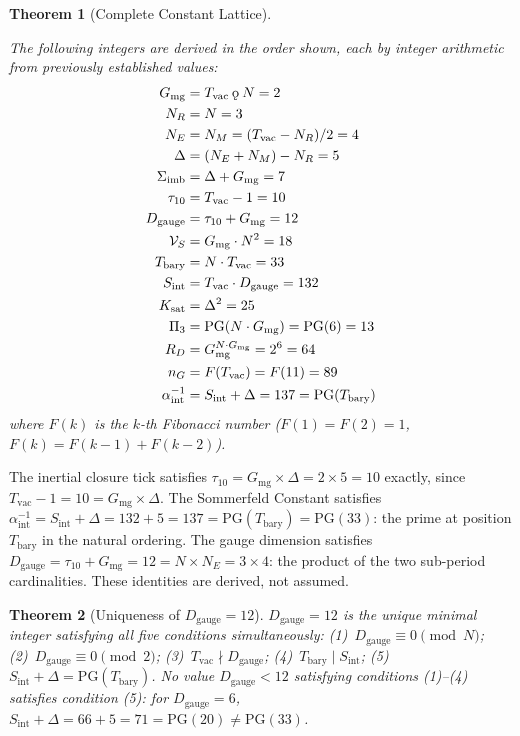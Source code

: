 \documentclass[11pt,letterpaper]{article}
\theoremstyle{plain}
\newtheorem{theorem}{Theorem}[section]
\theoremstyle{definition}
\theoremstyle{remark}
\newcommand{\koppa}{\mathbin{\text{\rm\k{o}}}}
\newcommand{\Tbary}{T_{\mathrm{bary}}}
\newcommand{\Dg}{D_{\mathrm{gauge}}}
\newcommand{\Sint}{S_{\mathrm{int}}}
\newcommand{\Sigimb}{\Sigma_{\mathrm{imb}}}
\newcommand{\VS}{\mathcal{V}_S}
\newcommand{\PG}{\mathrm{PG}}
\newcommand{\Gmg}{G_{\mathrm{mg}}}
\newcommand{\Ksat}{K_{\mathrm{sat}}}
\newcommand{\Tvac}{T_{\mathrm{vac}}}
\newcommand{\tauX}{\tau_{10}}
\newcommand{\Pithree}{\Pi_3}
\newcommand{\nG}{n_G}
\newcommand{\aSC}{\alpha^{-1}_{\mathrm{int}}}
\newcommand{\RD}{R_D}
\newcommand{\FibN}[1]{F(#1)}
\begin{document}
\begin{theorem}[Complete Constant Lattice]\label{thm:lattice}
\begin{rsbox}
The following integers are derived in the order shown, each by
integer arithmetic from previously established values:
\begin{align}
\Gmg &= \Tvac\koppa N = 2 \label{eq:gmg}\\
N_R &= N = 3 \label{eq:nr}\\
N_E &= N_M = (\Tvac-N_R)/2 = 4 \label{eq:ne}\\
\Delta &= (N_E+N_M)-N_R = 5 \label{eq:delta}\\
\Sigimb &= \Delta+\Gmg = 7 \label{eq:sigma}\\
\tauX &= \Tvac-1 = 10 \label{eq:tau10}\\
\Dg &= \tauX+\Gmg = 12 \label{eq:dg}\\
\VS &= \Gmg\cdot N^2 = 18 \label{eq:vs}\\
\Tbary &= N\cdot\Tvac = 33 \label{eq:tbary}\\
\Sint &= \Tvac\cdot\Dg = 132 \label{eq:sint}\\
\Ksat &= \Delta^2 = 25 \label{eq:ksat}\\
\Pithree &= \PG(N\cdot\Gmg) = \PG(6) = 13 \label{eq:pi3}\\
\RD &= \Gmg^{N\cdot\Gmg} = 2^6 = 64 \label{eq:rd}\\
\nG &= \FibN{\Tvac} = \FibN{11} = 89 \label{eq:ng}\\
\aSC &= \Sint+\Delta = 137 = \PG(\Tbary) \label{eq:alpha}
\end{align}
where $\FibN{k}$ is the $k$-th Fibonacci number
($\FibN{1}=\FibN{2}=1$, $\FibN{k}=\FibN{k-1}+\FibN{k-2}$).
\end{rsbox}
\end{theorem}

\begin{observebox}
The inertial closure tick satisfies $\tauX=\Gmg\times\Delta=2\times5=10$
exactly, since $\Tvac-1=10=\Gmg\times\Delta$.  The Sommerfeld Constant
satisfies $\aSC=\Sint+\Delta=132+5=137=\PG(\Tbary)=\PG(33)$: the prime
at position $\Tbary$ in the natural ordering.  The gauge dimension
satisfies $\Dg=\tauX+\Gmg=12=N\times N_E=3\times4$: the product of the
two sub-period cardinalities.  These identities are derived, not assumed.
\end{observebox}

\begin{theorem}[Uniqueness of $\Dg=12$]\label{thm:dg-unique}
$\Dg=12$ is the unique minimal integer satisfying all five conditions
simultaneously: (1)~$\Dg\equiv0\pmod{N}$; (2)~$\Dg\equiv0\pmod{2}$;
(3)~$\Tvac\nmid\Dg$; (4)~$\Tbary\mid\Sint$; (5)~$\Sint+\Delta=\PG(\Tbary)$.
No value $\Dg<12$ satisfying conditions (1)--(4) satisfies condition (5):
for $\Dg=6$, $\Sint+\Delta=66+5=71=\PG(20)\neq\PG(33)$.
\end{theorem}
\end{document}
